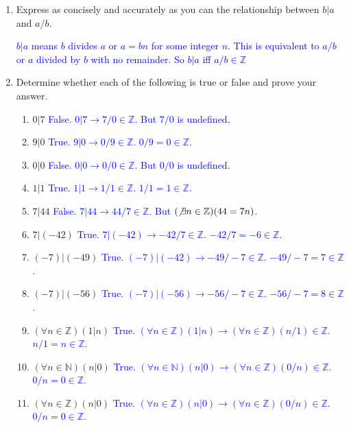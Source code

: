 \documentclass[13.5pt]{article}
\begin{document}
\begin{enumerate}

\item{Express as concisely and accurately as you can the relationship between \(b|a\) and \(a/b\).}

\textcolor{blue} {\(b|a\) means \(b\) divides \(a\) or \(a=bn\) for some integer \(n\). This is equivalent to \(a/b\) or \(a\) divided by \(b\) with no remainder. So \(b|a\) iff \(a/b \in \mathbb{Z}\)}

\item{Determine whether each of the following is true or false and prove your answer.}

\begin{enumerate}
\setlength{\itemindent}{.1in}
\item{\(0|7\)}
\textcolor{blue} {False. \(0|7 \rightarrow 7/0 \in \mathbb{Z}\). But \(7/0\) is undefined.}
\item{\(9|0\)}
\textcolor{blue} {True. \(9|0 \rightarrow 0/9 \in \mathbb{Z}\). \(0/9 = 0 \in \mathbb{Z}\).}
\item{\(0|0\)}
\textcolor{blue} {False. \(0|0 \rightarrow 0/0 \in \mathbb{Z}\). But \(0/0\) is undefined.}
\item{\(1|1\)}
\textcolor{blue} {True. \(1|1 \rightarrow 1/1 \in \mathbb{Z}\). \(1/1 = 1 \in \mathbb{Z}\).}
\item{\(7|44\)}
\textcolor{blue} {False. \(7|44 \rightarrow 44/7 \in \mathbb{Z}\). But \((\not\exists n \in \mathbb{Z})(44=7n)\).}
\item{\(7|(-42)\)}
\textcolor{blue} {True. \(7|(-42) \rightarrow -42/7 \in \mathbb{Z}\). \(-42/7 = -6 \in \mathbb{Z}\).}
\item{\((-7)|(-49)\)}
\textcolor{blue} {True. \((-7)|(-42) \rightarrow -49/-7 \in \mathbb{Z}\). \(-49/-7 = 7 \in \mathbb{Z}\).}
\item{\((-7)|(-56)\)}
\textcolor{blue} {True. \((-7)|(-56) \rightarrow -56/-7 \in \mathbb{Z}\). \(-56/-7 = 8 \in \mathbb{Z}\).}
\item{\((\forall n  \in \mathbb{Z})(1|n) \)}
\textcolor{blue} {True. \((\forall n  \in \mathbb{Z})(1|n) \rightarrow (\forall n  \in \mathbb{Z})(n/1) \in \mathbb{Z}\). \(n/1 = n \in \mathbb{Z}\).}
\item{\((\forall n  \in \mathbb{N})(n|0) \)}
\textcolor{blue} {True. \((\forall n  \in \mathbb{N})(n|0) \rightarrow (\forall n  \in \mathbb{Z})(0/n) \in \mathbb{Z}\). \(0/n = 0 \in \mathbb{Z}\).}
\item{\((\forall n  \in \mathbb{Z})(n|0) \)}
\textcolor{blue} {True. \((\forall n  \in \mathbb{Z})(n|0) \rightarrow (\forall n  \in \mathbb{Z})(0/n) \in \mathbb{Z}\). \(0/n = 0 \in \mathbb{Z}\).}
\end{enumerate}


\end{enumerate}
\end{document}
